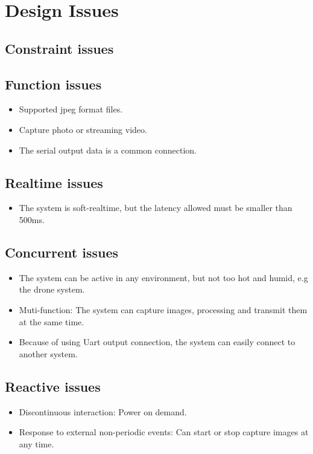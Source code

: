 \documentclass[D:/Latex/Internship/Report/Latex/Report.tex]{subfiles}
\begin{document}
  \chapter{Design Issues}
  \label{chap:Design Issues}
    \section{Constraint issues}
    \label{sec:Constraint issues}


    \section{Function issues}
    \label{sec:Function issues}
      \begin{itemize}
        \item Supported jpeg format files.
        \item Capture photo or streaming video.
        \item The serial output data is a common connection.
      \end{itemize}


    \section{Realtime issues}
    \label{sec:Realtime issues}
      \begin{itemize}
        \item The system is soft-realtime, but the latency allowed must be smaller than 500ms.
      \end{itemize}

    \section{Concurrent issues}  
    \label{sec:Concurrent issues}
      \begin{itemize}
        \item The system can be active in any environment, but not too hot and humid, e.g the drone system.
        \item Muti-function: The system can capture images, processing and transmit them at the same time.
        \item Because of using Uart output connection, the system can easily connect to another system. 
      \end{itemize}

    \section{Reactive issues}
    \label{sec:Reactive issues}
      \begin{itemize}
        \item Discontinuous interaction: Power on demand.
        \item Response to external non-periodic events: Can start or stop capture images at any time.
      \end{itemize}
\end{document}
